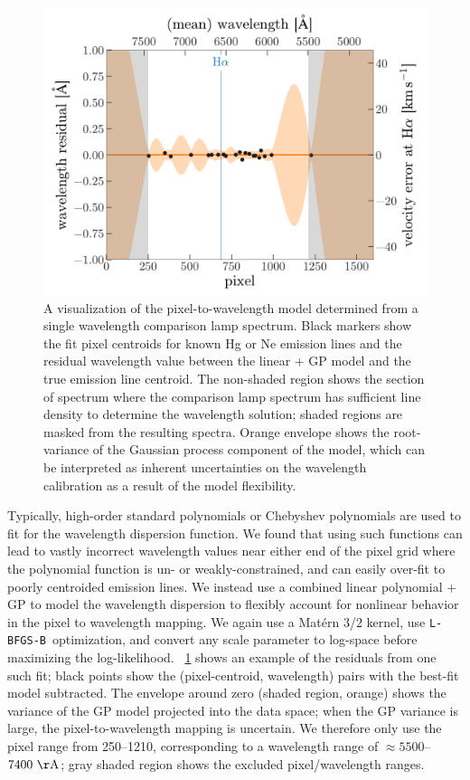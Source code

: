\documentclass[modern, letterpaper]{aastex61}
\newcommand{\lbfgsb}{\texttt{L-BFGS-B}}
\begin{document}
\begin{figure}[htbp]
  \begin{center}
    \includegraphics[width=0.8\linewidth]{wavelength_gp.pdf}
  \end{center}
  \caption{%
    A visualization of the pixel-to-wavelength model determined from a single
    wavelength comparison lamp spectrum.
    Black markers show the fit pixel centroids for known Hg or Ne emission
    lines and the residual wavelength value between the linear + GP model and
    the true emission line centroid.
    The non-shaded region shows the section of spectrum where the comparison
    lamp spectrum has sufficient line density to determine the wavelength
    solution; shaded regions are masked from the resulting spectra.
    Orange envelope shows the root-variance of the Gaussian process component
    of the model, which can be interpreted as inherent uncertainties on the
    wavelength calibration as a result of the model flexibility.
    \label{fig:wavelength-GP}}
\end{figure}

Typically, high-order standard polynomials or Chebyshev polynomials are used to
fit for the wavelength dispersion function.
We found that using such functions can lead to vastly incorrect wavelength
values near either end of the pixel grid where the polynomial function is
un- or weakly-constrained, and can easily over-fit to poorly centroided emission
lines.
We instead use a combined linear polynomial + GP to model the wavelength
dispersion to flexibly account for nonlinear behavior in the pixel to wavelength
mapping.
We again use a Mat\'ern 3/2 kernel, use \lbfgsb\ optimization, and convert any
scale parameter to log-space before maximizing the log-likelihood.
\figurename~\ref{fig:wavelength-GP} shows an example of the residuals from one
such fit; black points show the (pixel-centroid, wavelength) pairs with the
best-fit model subtracted.
The envelope around zero (shaded region, orange) shows the variance of the GP
model projected into the data space; when the GP variance is large, the
pixel-to-wavelength mapping is uncertain.
We therefore only use the pixel range from 250--1210, corresponding to a
wavelength range of $\approx 5500$--$7400~{\rm \AA}$; gray shaded region shows
the excluded pixel/wavelength ranges.
\end{document}
